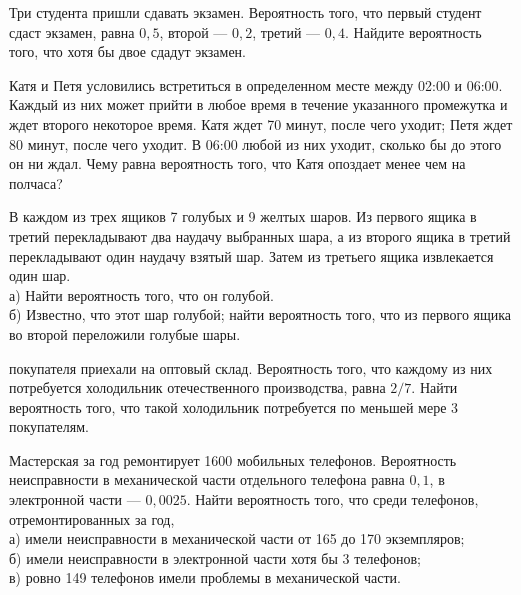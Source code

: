 \newpage\setcounter{zad}{0}



\begin{zkrW}{20}\noindent 
	Три студента пришли сдавать экзамен. Вероятность того, что первый студент сдаст экзамен, равна $0{,}5$, второй --- $0{,}2$, третий --- $0{,}4$. Найдите вероятность того, что хотя бы двое сдадут экзамен.
 
\end{zkrW}

\begin{zkrW}{20}\noindent 
	Катя и Петя условились встретиться в определенном месте между 02:00 и 06:00. Каждый из них может прийти в любое время в течение указанного промежутка и ждет второго некоторое время. Катя ждет 70 минут, после чего уходит; Петя ждет 80 минут, после чего уходит. В 06:00 любой из них уходит, сколько бы до этого он ни ждал. Чему равна вероятность того, что Катя опоздает менее чем на полчаса?
 
\end{zkrW}

\begin{zkrW}{20}\noindent 
	В каждом из трех ящиков 7 голубых и 9 желтых шаров. Из первого ящика в третий перекладывают два наудачу выбранных шара, а из второго ящика в третий перекладывают один наудачу взятый шар. Затем из третьего ящика извлекается один шар. \\ \indent а) Найти вероятность того, что он голубой. \\ \indent б) Известно, что этот шар голубой; найти вероятность того, что из первого ящика во второй переложили голубые шары.
 
\end{zkrW}

\begin{zkrW}{20} покупателя приехали на оптовый склад. Вероятность того, что каждому из них потребуется холодильник отечественного производства, равна $2/7$. Найти вероятность того, что такой холодильник потребуется по меньшей мере 3 покупателям.
 
\end{zkrW}

\begin{zkrW}{20}\noindent 
	Мастерская за год ремонтирует 1600 мобильных телефонов. Вероятность неисправности в механической части отдельного телефона равна $0{,}1$, в электронной части --- $0{,}0025$. Найти вероятность того, что среди телефонов, отремонтированных за год, \\ \indent а) имели неисправности в механической части от 165 до 170 экземпляров; \\ \indent б) имели неисправности в электронной части хотя бы 3 телефонов; \\ \indent в) ровно 149 телефонов имели проблемы в механической части.
 
\end{zkrW}

